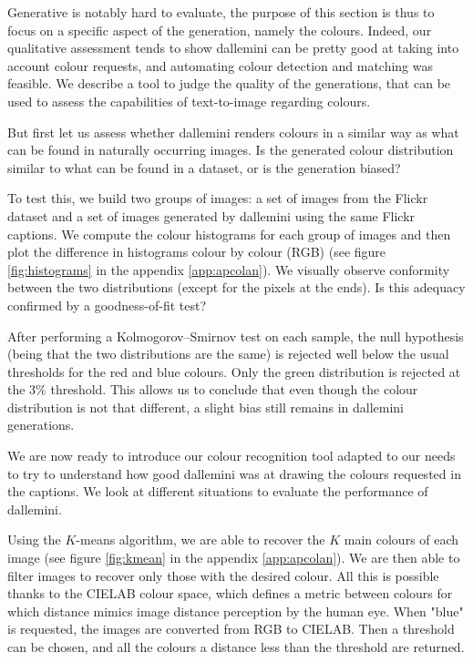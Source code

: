 \documentclass{article}
\begin{document}
\begin{multicols}{2}
Generative is notably hard to evaluate, the purpose of this section is thus to focus on a specific aspect of the generation, namely the colours.
Indeed, our qualitative assessment tends to show \gls{dallemini} can be pretty good at taking into account colour requests, and automating colour detection and matching was feasible.
We describe a tool to judge the quality of the generations, that can be used to assess the capabilities of text-to-image regarding colours.

But first let us assess whether \gls{dallemini} renders colours in a similar way as what can be found in naturally occurring images.  Is the generated colour distribution similar to what can be found in a dataset, or is the generation biased?

To test this, we build two groups of images: a set of images from the Flickr dataset and a set of images generated by \gls{dallemini} using the same Flickr captions. We compute the colour histograms for each group of images and then plot the difference in histograms colour by colour (RGB) (see figure \ref{fig:histograms} in the appendix \ref{app:apcolan}). We visually observe conformity between the two distributions (except for the pixels at the ends). Is this adequacy confirmed by a goodness-of-fit test?

After performing a Kolmogorov–Smirnov test on each sample, the null hypothesis (being that the two distributions are the same) is rejected well below the usual thresholds for the red and blue colours. Only the green distribution is rejected at the 3\% threshold. This allows us to conclude that even though the colour distribution is not that different, a slight bias still remains in \gls{dallemini} generations.

We are now ready to introduce our colour recognition tool adapted to our needs to try to understand how good \gls{dallemini} was at drawing the colours requested in the captions. We look at different situations to evaluate the performance of \gls{dallemini}. %

Using the $K$-means algorithm, we are able to recover the $K$ main colours of each image (see figure \ref{fig:kmean} in the appendix \ref{app:apcolan}). We are then able to filter images to recover only those with the desired colour. All this is possible thanks to the CIELAB colour space, which defines a metric between colours for which distance mimics image distance perception by the human eye. When "blue" is requested, the images are converted from RGB to CIELAB. Then a threshold can be chosen, and all the colours a distance less than the threshold are returned.


\end{multicols}
\end{document}
